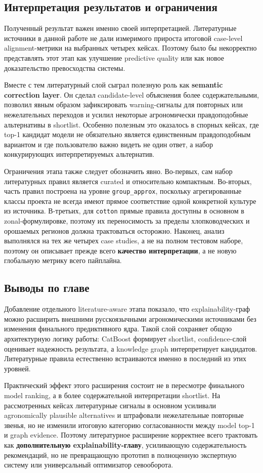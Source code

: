 \subsection{Интерпретация результатов и ограничения}

Полученный результат важен именно своей интерпретацией. Литературные источники в данной работе не дали измеримого прироста итоговой case-level alignment-метрики на выбранных четырех кейсах. Поэтому было бы некорректно представлять этот этап как улучшение predictive quality или как новое доказательство превосходства системы.

Вместе с тем литературный слой сыграл полезную роль как \textbf{semantic correction layer}. Он сделал candidate-level объяснения более содержательными, позволил явным образом зафиксировать warning-сигналы для повторных или нежелательных переходов и усилил некоторые агрономически правдоподобные альтернативы в shortlist. Особенно полезным это оказалось в спорных кейсах, где top-1 кандидат модели не обязательно является единственным правдоподобным вариантом и где пользователю важно видеть не один ответ, а набор конкурирующих интерпретируемых альтернатив.

Ограничения этапа также следует обозначить явно. Во-первых, сам набор литературных правил является curated и относительно компактным. Во-вторых, часть правил построена на уровне \texttt{group\_approx}, поскольку агрегированные классы проекта не всегда имеют прямое соответствие одной конкретной культуре из источника. В-третьих, для \texttt{cotton} прямые правила доступны в основном в zonal-формулировке, поэтому их переносимость за пределы хлопководческих и орошаемых регионов должна трактоваться осторожно. Наконец, анализ выполнялся на тех же четырех case studies, а не на полном тестовом наборе, поэтому он описывает прежде всего \textbf{качество интерпретации}, а не новую глобальную метрику всего пайплайна.

\subsection{Выводы по главе}

Добавление отдельного literature-aware этапа показало, что explainability-граф можно расширить внешними русскоязычными агрономическими источниками без изменения финального предиктивного ядра. Такой слой сохраняет общую архитектурную логику работы: CatBoost формирует shortlist, confidence-слой оценивает надежность результата, а knowledge graph интерпретирует кандидатов. Литературные правила естественно встраиваются именно в последний из этих уровней.

Практический эффект этого расширения состоит не в пересмотре финального model ranking, а в более содержательной интерпретации shortlist. На рассмотренных кейсах литературные сигналы в основном усиливали agronomically plausible alternatives и штрафовали нежелательные повторные звенья, но не изменили итоговую категорию согласованности между model top-1 и graph evidence. Поэтому литературное расширение корректнее всего трактовать как \textbf{дополнительную explainability-главу}, усиливающую содержательность рекомендаций, но не превращающую прототип в полноценную экспертную систему или универсальный оптимизатор севооборота.
